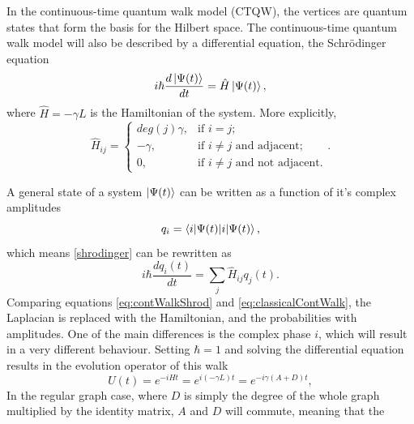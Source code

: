 \documentclass[../../dissertation.tex]{subfiles}
\begin{document}
In the continuous-time quantum walk model (CTQW), the vertices are quantum
states that form the basis for the Hilbert space. The continuous-time quantum
walk model will also be described by a differential equation, the Schrödinger
equation
\begin{equation}
	i\hbar \frac{d\ket{\Psi(t)}}{dt} = \hat{H} \ket{\Psi(t)}, \label{shrodinger}
\end{equation}
where $\hat{H} = -\gamma L$ is the Hamiltonian of the system. More explicitly,
\begin{equation}
	\hat{H}_{ij} = \begin{cases} 
		deg(j)\gamma, & \mbox{if } i= j; \\ 
		-\gamma, & \mbox{if } i\neq j\mbox{ and adjacent};\\
		0, & \mbox{if } i\neq j\mbox{ and not adjacent}.
	\end{cases}.
	\label{Hamilt}
\end{equation}\par
A general state of a system $\ket{\Psi(t)}$ can be written as a function of
it's complex amplitudes 
\begin{equation}
	q_i = \braket{i|\Psi(t)},
\end{equation}
which means \ref{shrodinger} can be rewritten as 
\begin{equation}
	i\hbar \frac{dq_i(t)}{dt} = \sum_j \hat{H}_{ij} q_j(t).
	\label{eq:contWalkShrod}
\end{equation}
Comparing equations \ref{eq:contWalkShrod} and \ref{eq:classicalContWalk}, the
Laplacian is replaced with the Hamiltonian, and the probabilities with
amplitudes. One of the main differences is the complex phase $i$, which will
result in a very different behaviour. 
Setting $\hbar = 1$ and solving the differential equation results in the
evolution operator of this walk 
\begin{equation}
	U(t) = e^{-iHt} = e^{i(-\gamma L)t} = e^{-i\gamma(A+D)t},
\end{equation}
In the regular graph case, where $D$ is simply the degree of the whole graph
multiplied by the identity matrix, $A$ and $D$ will commute, meaning that the
\end{document}
